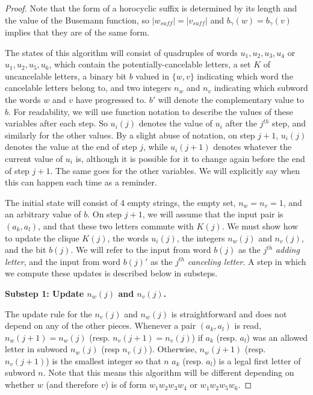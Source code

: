 \documentclass{amsart}
\theoremstyle{definition}
\theoremstyle{remark}
\begin{document}
	\begin{proof}
		Note that the form of a horocyclic suffix is determined by its length and the value of the Busemann function, so $|w_{suff}|=|v_{suff}|$ and $b_\gamma(w)=b_\gamma(v)$ implies that they are of the same form.
		
		The states of this algorithm will consist of quadruples of words $u_1, u_2, u_3, u_4$ or $u_1, u_2, u_5, u_6$, which contain the potentially-cancelable letters, a set $K$ of uncancelable letters, a binary bit $b$ valued in $\{w, v\}$ indicating which word the cancelable letters belong to, and two integers $n_w$ and $n_v$ indicating which subword the words $w$ and $v$ have progressed to. $b'$ will denote the complementary value to $b$. For readability, we will use function notation to describe the values of these variables after each step. So $u_i(j)$ denotes the value of $u_i$ after the $j^{th}$ step, and similarly for the other values. By a slight abuse of notation, on step $j+1$, $u_i(j)$ denotes the value at the end of step $j$, while $u_i(j+1)$ denotes whatever the current value of $u_i$ is, although it is possible for it to change again before the end of step $j+1$. The same goes for the other variables. We will explicitly say when this can happen each time as a reminder.
		
		The initial state will consist of 4 empty strings, the empty set, $n_w=n_v=1$, and an arbitrary value of $b$. On step $j+1$, we will assume that the input pair is $(a_k, a_l)$, and that these two letters commute with $K(j)$. We must show how to update the clique $K(j)$, the words $u_i(j)$, the integers $n_{w}(j)$ and $n_v(j)$, and the bit $b(j)$. We will refer to the input from word $b(j)$ as the $j^{th}$\textit{ adding letter}, and the input from word $b(j)'$ as the $j^{th}$ \textit{canceling letter}. A step in which we compute these updates is described below in substeps.
		
		\textbf{Substep 1: Update $n_w(j)$ and $n_v(j)$.}
		
		The update rule for the $n_v(j)$ and $n_w(j)$ is straightforward and does not depend on any of the other pieces. Whenever a pair $(a_k, a_l)$ is read, $n_w(j+1)=n_w(j)$ (resp. $n_v(j+1)=n_v(j)$) if $a_k$ (resp. $a_l$) was an allowed letter in subword $n_w(j)$ (resp $n_v(j)$). Otherwise, $n_w(j+1)$ (resp. $n_v(j+1)$) is the smallest integer so that $n$ $a_k$ (resp. $a_l$) is a legal first letter of subword $n$. Note that this means this algorithm will be different depending on whether $w$ (and therefore $v$) is of form $w_1w_2w_3w_4$ or $w_1w_2w_5w_6$.
		

\end{proof}
\end{document}
